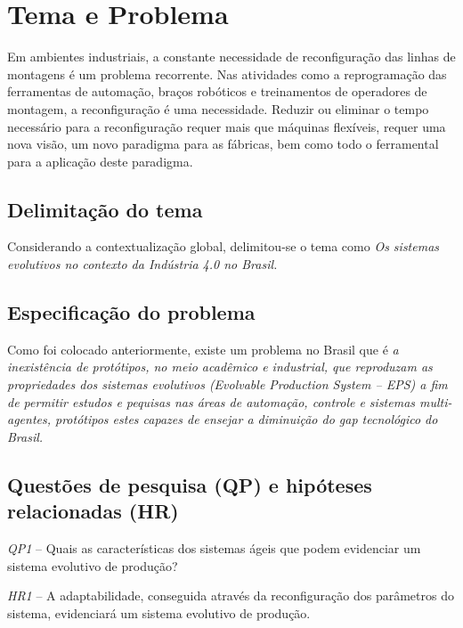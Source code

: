 

\section{Tema e Problema}

Em ambientes industriais, a constante necessidade de reconfiguração das linhas de montagens é um problema recorrente. Nas atividades como a reprogramação das ferramentas de automação, braços robóticos e treinamentos de operadores de montagem, a reconfiguração é uma necessidade. Reduzir ou eliminar o tempo necessário para a reconfiguração requer mais que máquinas flexíveis, requer uma nova visão, um novo paradigma para as fábricas, bem como todo o ferramental para a aplicação deste paradigma.  		


\subsection{Delimitação do tema}
		
Considerando a contextualização global, delimitou-se o tema como \emph{Os sistemas evolutivos no contexto da Indústria 4.0 no Brasil.} 


\subsection{Especificação do problema}

Como foi colocado anteriormente, existe um problema no Brasil que é \emph{a inexistência de protótipos, no meio acadêmico e industrial, que reproduzam as propriedades dos sistemas evolutivos \textit{ (Evolvable Production System -- EPS)} a fim de permitir estudos e pequisas nas áreas de automação, controle e sistemas multi-agentes, protótipos estes capazes de ensejar a diminuição do gap tecnológico do Brasil.}

 	
\subsection{Questões de pesquisa (QP) e hipóteses relacionadas (HR)}	

	
\emph{QP1} -- Quais as características dos sistemas ágeis que podem evidenciar um sistema evolutivo de produção?
	
\emph{HR1} -- A adaptabilidade, conseguida através da reconfiguração dos parâmetros do sistema, evidenciará um sistema evolutivo de produção.

